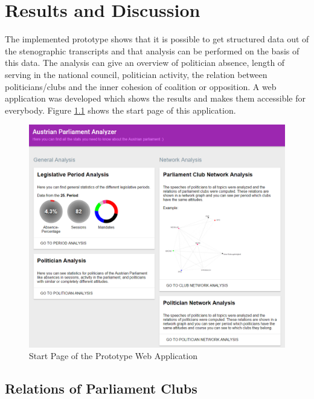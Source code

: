 \chapter{Results and Discussion}
\label{chap:evaluation}

The implemented prototype shows that it is possible to get structured data out of the stenographic transcripts and that analysis can be performed on the basis of this data. The analysis can give an overview of politician absence, length of serving in the national council, politician activity, the relation between politicians/clubs and the inner cohesion of coalition or opposition. A web application was developed which shows the results and makes them accessible for everybody. Figure \ref{fig:start_page_prototype} shows the start page of this application.

\begin{figure}[h]
	\includegraphics[width=\textwidth]{imgs/result_start_page}
	\caption{Start Page of the Prototype Web Application}
	\label{fig:start_page_prototype}
\end{figure}

\section{Relations of Parliament Clubs}
\label{sec:relations_clubs}

